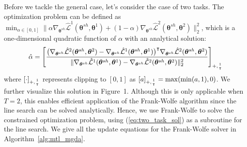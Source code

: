 \documentclass{article}
\def\lL{\mathcal{L}}
\def\btheta{{\bm\theta}}
\begin{document}
Before we tackle the general case, let's consider the case of two tasks. The optimization problem can be defined as \mbox{$\min_{\alpha \in [0,1]} \| \alpha \nabla_{\btheta^{sh}}\hat{\lL}^1(\btheta^{sh},\btheta^1)+ (1-\alpha) \nabla_{\btheta^{sh}}\hat{\lL}^2(\btheta^{sh},\btheta^2) \|_2^2$}, which is a one-dimensional quadratic function of $\alpha$ with an analytical solution:
\begin{equation}
\hat{\alpha}= \left[\frac{\big(\nabla_{\btheta^{sh}}\hat{\lL}^2(\btheta^{sh},\btheta^2) - \nabla_{\btheta^{sh}}\hat{\lL}^1(\btheta^{sh},\btheta^1)\big)^\intercal  \nabla_{\btheta^{sh}}\hat{\lL}^2(\btheta^{sh},\btheta^2)  }{\|\nabla_{\btheta^{sh}}\hat{\lL}^1(\btheta^{sh},\btheta^1) - \nabla_{\btheta^{sh}}\hat{\lL}^2(\btheta^{sh},\btheta^2)\|_2^2}\right]_{+,{1 \atop \intercal}}
\label{eq:two_task_sol}
\end{equation}
where $[\cdot]_{+,{1 \atop \intercal}}$ represents clipping to $[0,1]$ as $[a]_{+,{1 \atop \intercal}} = \max(\min(a, 1),0)$. We further visualize this solution in Figure~1. Although this is only applicable when $T=2$, this enables efficient application of the Frank-Wolfe algorithm \citep{Jaggi2013} since the line search can be solved analytically. Hence, we use Frank-Wolfe to solve the constrained optimization problem, using (\ref{eq:two_task_sol}) as a subroutine for the line search. We give all the update equations for the Frank-Wolfe solver in Algorithm~\ref{alg:mtl_mgda}.
\end{document}
